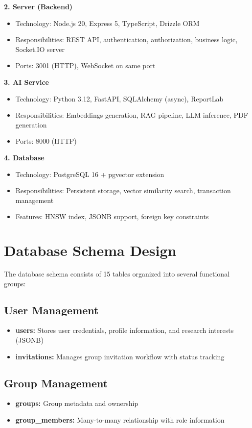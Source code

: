 \documentclass[12pt]{report}
\begin{document}
\textbf{2. Server (Backend)}
\begin{itemize}
    \item Technology: Node.js 20, Express 5, TypeScript, Drizzle ORM
    \item Responsibilities: REST API, authentication, authorization, business logic, Socket.IO server
    \item Ports: 3001 (HTTP), WebSocket on same port
\end{itemize}

\textbf{3. AI Service}
\begin{itemize}
    \item Technology: Python 3.12, FastAPI, SQLAlchemy (async), ReportLab
    \item Responsibilities: Embeddings generation, RAG pipeline, LLM inference, PDF generation
    \item Ports: 8000 (HTTP)
\end{itemize}

\textbf{4. Database}
\begin{itemize}
    \item Technology: PostgreSQL 16 + pgvector extension
    \item Responsibilities: Persistent storage, vector similarity search, transaction management
    \item Features: HNSW index, JSONB support, foreign key constraints
\end{itemize}

\section{Database Schema Design}

The database schema consists of 15 tables organized into several functional groups:

\subsection{User Management}
\begin{itemize}
    \item \textbf{users:} Stores user credentials, profile information, and research interests (JSONB)
    \item \textbf{invitations:} Manages group invitation workflow with status tracking
\end{itemize}

\subsection{Group Management}
\begin{itemize}
    \item \textbf{groups:} Group metadata and ownership
    \item \textbf{group\_members:} Many-to-many relationship with role information
\end{itemize}
\end{document}
